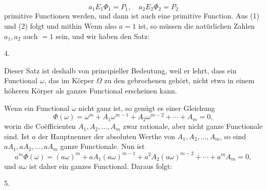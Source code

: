 \[
a_1E_1\Phi_1 = P_1, \quad a_2E_2\Phi_2 = P_2
\]
primitive Functionen werden, und dann ist auch
eine primitive Function. Aus (1) und (2) folgt
und mithin
Wenn also $a=1$ ist, so müssen die natürlichen Zahlen $a_1, a_2$ auch $=1$ sein, und wir haben den Satz:

4. 

Dieser Satz ist deshalb von principieller Bedeutung, weil er lehrt, dass ein Functional $\omega$, das im Körper $\Omega$ zu den gebrochenen gehört, nicht etwa in einem höheren Körper als ganzes Functional erscheinen kann.

Wenn ein Functional $\omega$ nicht ganz ist, so genügt es einer Gleichung
\[
\Phi(\omega) = \omega^m + A_1\omega^{m-1} + A_2\omega^{m-2} + \cdots + A_m = 0,
\]
worin die Coëfficienten $A_1, A_2, \ldots, A_m$ zwar rationale, aber nicht ganze Functionale sind. Ist $a$ der Hauptnenner der absoluten Werthe von $A_1, A_2, \ldots, A_m$, so sind $aA_1, aA_2, \ldots, aA_m$ ganze Functionale. Nun ist
\[
a^m\Phi(\omega) = (a\omega)^m + aA_1(a\omega)^{m-1} + a^2A_2(a\omega)^{m-2} + \cdots
+ a^mA_m = 0,
\]
und $a\omega$ ist daher ein ganzes Functional. Daraus folgt:

5. 
